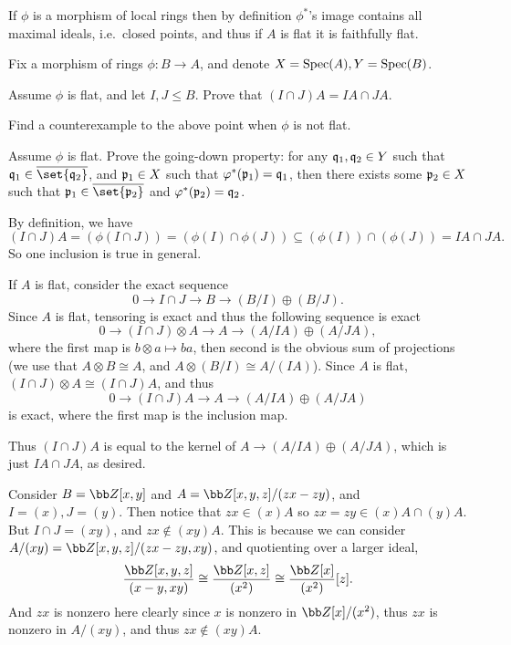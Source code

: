     \item If $\phi$ is a morphism of local rings then by definition $\phi^*$'s image contains all maximal ideals, i.e.\ closed points, and thus if $A$ is flat it is faithfully flat.
\eenum

\bprob

    Fix a morphism of rings $\phi\colon B\to A$, and denote $X={\rm Spec}(A),Y={\rm Spec}(B)$.
    \benum
        \item Assume $\phi$ is flat, and let $I,J\leq B$.
        Prove that $(I\cap J)A=IA\cap JA$.
        \item Find a counterexample to the above point when $\phi$ is not flat.
        \item Assume $\phi$ is flat.
        Prove the {\emphcolor going-down property}: for any ${{\frak q}}_1,{{\frak q}}_2\in Y$ such that $\q_1\in\cl{\set{\q_2}}$, and ${{\frak p}}_1\in X$ such that $\varphi^*({{\frak p}}_1)={{\frak q}}_1$,
        then there exists some ${{\frak p}}_2\in X$ such that $\p_1\in\cl{\set{\p_2}}$ and $\varphi^*({{\frak p}}_2)={{\frak q}}_2$.
    \eenum

\eprob

\benum
    \item By definition, we have
    $$ (I\cap J)A = (\phi(I\cap J)) = (\phi(I)\cap\phi(J)) \subseteq (\phi(I))\cap(\phi(J)) = IA\cap JA . $$
    So one inclusion is true in general.

    If $A$ is flat, consider the exact sequence
    $$ 0 \to I\cap J \to B \to (B/I) \oplus (B/J) . $$
    Since $A$ is flat, tensoring is exact and thus the following sequence is exact
    $$ 0 \to (I\cap J)\otimes A \to A \to (A/IA) \oplus (A/JA) , $$
    where the first map is $b\otimes a\mapsto ba$, then second is the obvious sum of projections (we use that $A\otimes B\cong A$, and $A\otimes(B/I)\cong A/(IA)$).
    Since $A$ is flat, $(I\cap J)\otimes A\cong(I\cap J)A$, and thus
    $$ 0 \to (I\cap J)A \to A \to (A/IA) \oplus (A/JA) $$
    is exact, where the first map is the inclusion map.

    Thus $(I\cap J)A$ is equal to the kernel of $A\to(A/IA)\oplus(A/JA)$, which is just $IA\cap JA$, as desired.

    \item Consider $B=\bZ[x,y]$ and $A=\bZ[x,y,z]/(zx-zy)$, and $I=(x),J=(y)$.
    Then notice that $zx\in(x)A$ so $zx=zy\in(x)A\cap(y)A$.
    But $I\cap J=(xy)$, and $zx\notin(xy)A$.
    This is because we can consider $A/(xy)=\bZ[x,y,z]/(zx-zy,xy)$, and quotienting over a larger ideal,
    $$ \frac{\bZ[x,y,z]}{(x-y,xy)} \cong \frac{\bZ[x,z]}{(x^2)} \cong \frac{\bZ[x]}{(x^2)}[z] . $$
    And $zx$ is nonzero here clearly since $x$ is nonzero in $\bZ[x]/(x^2)$, thus $zx$ is nonzero in $A/(xy)$, and thus $zx\notin(xy)A$.

